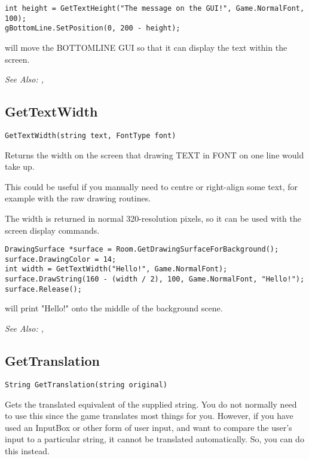 \begin{verbatim}
int height = GetTextHeight("The message on the GUI!", Game.NormalFont, 100);
gBottomLine.SetPosition(0, 200 - height);
\end{verbatim}
will move the BOTTOMLINE GUI so that it can display the text within the screen.

\it{See Also:} , 



\subsection{GetTextWidth}\label{GetTextWidth}%

\begin{verbatim}
GetTextWidth(string text, FontType font)
\end{verbatim}
Returns the width on the screen that drawing TEXT in FONT on one line would take up.

This could be useful if you manually need to centre or right-align some text, for
example with the raw drawing routines.

The width is returned in normal 320-resolution pixels, so it can be used with the
screen display commands.

\begin{verbatim}
DrawingSurface *surface = Room.GetDrawingSurfaceForBackground();
surface.DrawingColor = 14;
int width = GetTextWidth("Hello!", Game.NormalFont);
surface.DrawString(160 - (width / 2), 100, Game.NormalFont, "Hello!");
surface.Release();
\end{verbatim}
will print "Hello!" onto the middle of the background scene.

\it{See Also:} , 


\subsection{GetTranslation}\label{GetTranslation}%

\begin{verbatim}
String GetTranslation(string original)
\end{verbatim}
Gets the translated equivalent of the supplied string. You do not normally
need to use this since the game translates most things for you. However,
if you have used an InputBox or other form of user input, and want to
compare the user's input to a particular string, it cannot be translated
automatically. So, you can do this instead.

